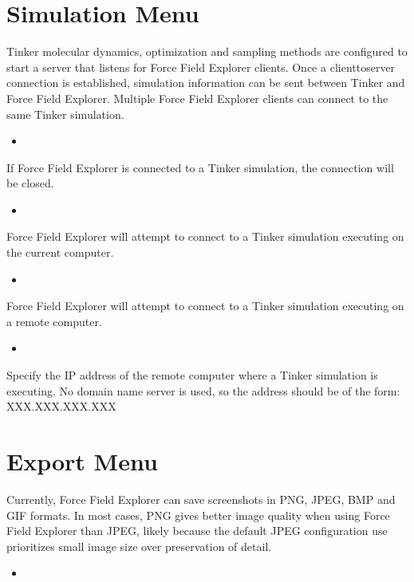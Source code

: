\documentclass[letterpaper,11pt,english]{sphinxmanual}
\begin{document}
\section{Simulation Menu}
\label{\detokenize{text/menus:simulation-menu}}
Tinker molecular dynamics, optimization and sampling methods are configured to start a server that listens for Force Field Explorer clients. Once a client\sphinxhyphen{}to\sphinxhyphen{}server connection is established, simulation information can be sent between Tinker and Force Field Explorer. Multiple Force Field Explorer clients can connect to the same Tinker simulation.
\begin{itemize}
\item {} 

\end{itemize}

If Force Field Explorer is connected to a Tinker simulation, the connection will be closed.
\begin{itemize}
\item {} 

\end{itemize}

Force Field Explorer will attempt to connect to a Tinker simulation executing on the current computer.
\begin{itemize}
\item {} 

\end{itemize}

Force Field Explorer will attempt to connect to a Tinker simulation executing on a remote computer.
\begin{itemize}
\item {} 

\end{itemize}

Specify the IP address of the remote computer where a Tinker simulation is executing. No domain name server is used, so the address should be of the form: XXX.XXX.XXX.XXX


\section{Export Menu}
\label{\detokenize{text/menus:export-menu}}
Currently, Force Field Explorer can save screenshots in PNG, JPEG, BMP and GIF formats. In most cases, PNG gives better image quality when using Force Field Explorer than JPEG, likely because the default JPEG configuration use prioritizes small image size over preservation of detail.
\begin{itemize}
\item {} 

\end{itemize}
\end{document}
